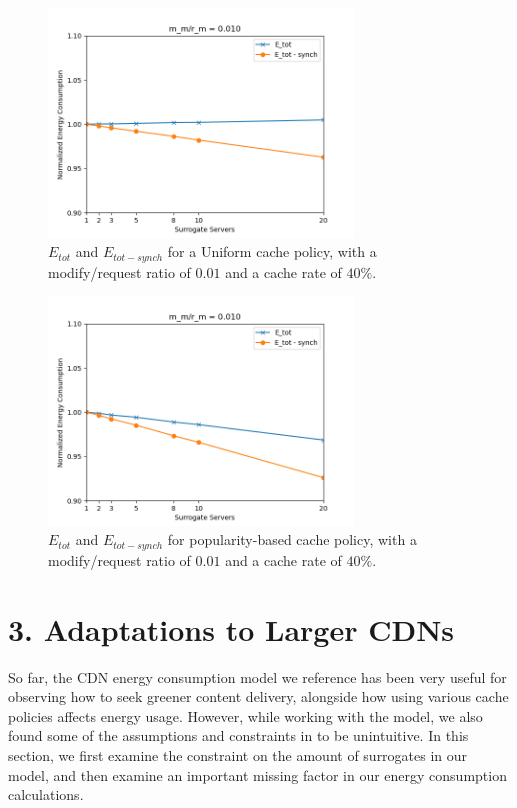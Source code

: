 \documentclass[
	a4paper, %
	10pt, %
	unnumberedsections, %
	twoside, %
]{LTJournalArticle}
\begin{document}
\begin{figure}[!hbt]
	\begin{center}
		\includegraphics[width=8.1cm]{plots/sc40ratio0.01uniform.png}
	\end{center}
	\caption{$E_{tot}$ and $E_{tot - synch}$ for a Uniform cache policy, with a modify/request ratio of $0.01$ and a cache rate of $40\%$.}	
    \label{s2uniform0.01}
\end{figure}
\begin{figure}[!hbt]
	\begin{center}
		\includegraphics[width=8.1cm]{plots/sc40ratio0.01zipf.png}
	\end{center}
	\caption{$E_{tot}$ and $E_{tot - synch}$ for popularity-based cache policy, with a modify/request ratio of $0.01$ and a cache rate of $40\%$.}
    \label{s2zipf0.01}
\end{figure}


\section{3. Adaptations to Larger CDNs}
So far, the CDN energy consumption model we reference has been very useful for observing how to seek greener content delivery, alongside how using various cache policies affects energy usage. However, while working with the model, we also found some of the assumptions and constraints in \cite{biancoCDNs2017} to be unintuitive. In this section, we first examine the constraint on the amount of surrogates in our model, and then examine an important missing factor in our energy consumption calculations.
\end{document}
